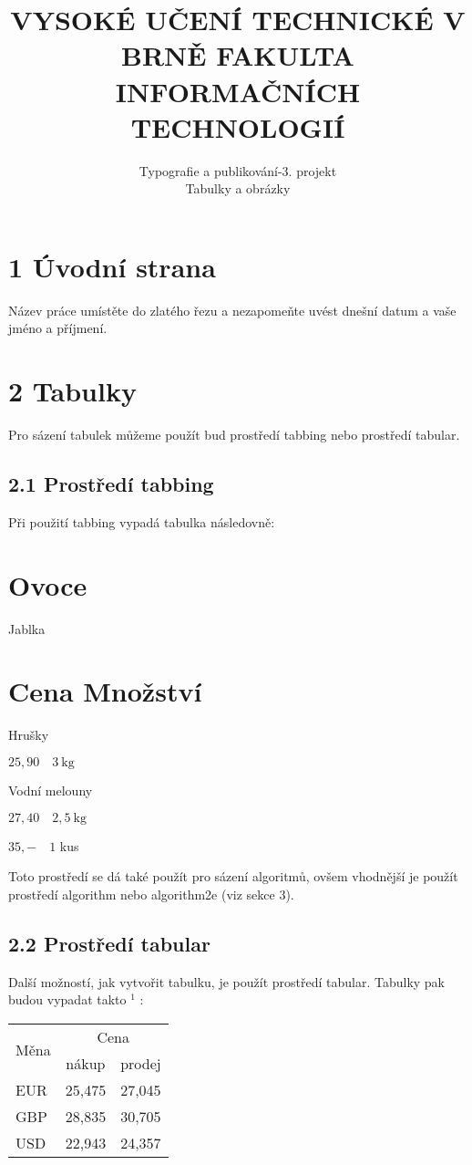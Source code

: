 \documentclass[10pt]{article}
\title{VYSOKÉ UČENÍ TECHNICKÉ V BRNĚ FAKULTA INFORMAČNÍCH TECHNOLOGIÍ }
\author{Typografie a publikování-3. projekt\\
Tabulky a obrázky}
\date{}
\begin{document}
\maketitle


\section*{1 Úvodní strana}
Název práce umístěte do zlatého řezu a nezapomeňte uvést dnešní datum a vaše jméno a příjmení.

\section*{2 Tabulky}
Pro sázení tabulek můžeme použít bud prostředí tabbing nebo prostředí tabular.

\subsection*{2.1 Prostředí tabbing}
Při použití tabbing vypadá tabulka následovně:

\section*{Ovoce}
Jablka

\section*{Cena Množství}
Hrušky

$25,90 \quad 3 \mathrm{~kg}$

Vodní melouny

$27,40 \quad 2,5 \mathrm{~kg}$

$35,-\quad 1$ kus

Toto prostředí se dá také použít pro sázení algoritmů, ovšem vhodnější je použít prostředí algorithm nebo algorithm2e (viz sekce 3).

\subsection*{2.2 Prostředí tabular}
Další možností, jak vytvořit tabulku, je použít prostředí tabular. Tabulky pak budou vypadat takto ${ }^{1}$ :

\begin{center}
\begin{tabular}{|l|c|c|}
\hline
\multirow{2}{*}{Měna} & \multicolumn{2}{|c|}{Cena} \\
\cline { 2 - 3 }
 & nákup & prodej \\
\hline
EUR & 25,475 & 27,045 \\
GBP & 28,835 & 30,705 \\
USD & 22,943 & 24,357 \\
\hline
\end{tabular}
\end{center}
\end{document}
